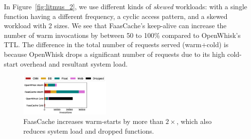 In Figure~\ref{fig:litmus_2}, we use different kinds of \emph{skewed} workloads: with a single function having a different frequency, a cyclic access pattern, and a skewed workload with 2 sizes. 
We see that FaasCache's keep-alive can increase the number of warm invocations by between 50 to 100\% compared to OpenWhisk's TTL.
The difference in the total number of requests served (warm+cold) is because OpenWhisk drops a significant number of requests due to its high cold-start overhead and resultant system load. 
%







\begin{figure}[t]
  \centering
\includegraphics[width=0.4\textwidth]{../graphs/litmus_tests/faasbench_48_cold_hot-legend.pdf}
\caption{FaasCache increases warm-starts by more than $2\times$, which also reduces system load and dropped functions.}
\label{fig:faasbench}
\end{figure}

